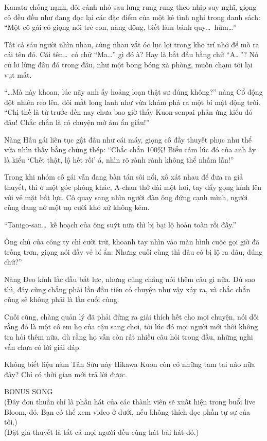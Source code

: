 \documentclass[../main.tex]{subfiles}
\begin{document}
Kanata chống nạnh, đôi cánh nhỏ sau lưng rung rung theo nhịp suy nghĩ, giọng cô đều đều như đang đọc lại các đặc điểm của một kẻ tình nghi trong danh sách: ``Một cô gái có giọng nói trẻ con, năng động, biết làm bánh quy\dots\ hừm\dots''

Tất cả sáu người nhìn nhau, cùng nhau vắt óc lục lọi trong kho trí nhớ để mò ra cái tên đó. Cái tên\dots\ có chữ ``Ma\dots'' gì đó à? Hay là bắt đầu bằng chữ ``A\dots''? Nó cứ lơ lửng đâu đó trong đầu, như một bong bóng xà phòng, muốn chạm tới lại vụt mất.

``\dots Mà này khoan, lúc nãy anh ấy hoảng loạn thật sự đúng không?'' nàng Cổ động đột nhiên reo lên, đôi mắt long lanh như vừa khám phá ra một bí mật động trời. ``Chị thề là từ trước đến nay chưa bao giờ thấy Kuon-senpai phản ứng kiểu đó đâu! Chắc chắn là có chuyện mờ ám ẩn giấu!''

Nàng Hầu gái liên tục gật đầu như cái máy, giọng cô đầy thuyết phục như thể vừa nhìn thấy bằng chứng thép: ``Chắc chắn 100\%! Biểu cảm lúc đó của anh ấy là kiểu `Chết thật, lộ hết rồi' á, nhìn rõ rành rành không thể nhầm lẫn!''

Trong khi nhóm cô gái vẫn đang bàn tán sôi nổi, xô xát nhau để đưa ra giả thuyết, thì ở một góc phòng khác, A-chan thở dài một hơi, tay đẩy gọng kính lên với vẻ mặt bất lực. Cô quay sang nhìn người đàn ông đứng cạnh mình, người cũng đang nở một nụ cười khó xử không kém.

``Tanigo-san\dots\ kế hoạch của ông suýt nữa thì bị bại lộ hoàn toàn rồi đấy.''

Ông chủ của công ty chỉ cười trừ, khoanh tay nhìn vào màn hình cuộc gọi giờ đã trống trơn, giọng nói đầy vẻ bí ẩn: Nhưng cuối cùng thì đâu có bị lộ ra đâu, đúng chứ?''

Nàng Đeo kính lắc đầu bất lực, nhưng cũng chẳng nói thêm câu gì nữa. Dù sao thì, đây cũng chẳng phải lần đầu tiên có chuyện như vậy xảy ra, và chắc chắn cũng sẽ không phải là lần cuối cùng.

Cuối cùng, chàng quản lý đã phải đứng ra giải thích hết cho mọi chuyện, nói dối rằng đó là một cô em họ của cậu sang chơi, tới lúc đó mọi người mới thôi không tra hỏi thêm nữa, dù rằng họ vẫn còn rất nhiều câu hỏi trong đầu, những nghi vấn chưa có lời giải đáp.

Không biết liệu năm Tân Sửu này Hikawa Kuon còn có những tam tai nào nữa đây? Chỉ có thời gian mới trả lời được.

\begin{center}{\ab BONUS SONG}\\(Đây đơn thuần chỉ là phần hát của các thành viên sẽ xuất hiện trong buổi live Bloom, đó. Bạn có thể xem video ở dưới, nếu không thích đọc phần tự sự của tôi.)
  \\(Đặt giả thuyết là tất cả mọi người đều cùng hát bài hát đó.)
\end{center}
\end{document}
